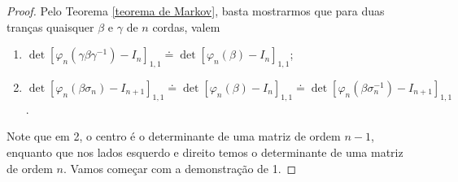 	\begin{proof}
		Pelo Teorema \ref{teorema de Markov}, basta mostrarmos que para duas tranças quaisquer 
		$\beta$ e $\gamma$ de $n$ cordas, valem
		\begin{enumerate}
			\item $\det[\varphi_n(\gamma\beta\gamma^{-1}) - I_n]_{1,1} \doteq \det[\varphi_n(\beta) - I_n]_{1,1}$;
			\item $\det[\varphi_n(\beta\sigma_n) - I_{n+1}]_{1,1}\doteq\det[\varphi_n(\beta) - I_n]_{1,1} 
			\doteq \det[\varphi_n(\beta\sigma_n^{-1}) - I_{n+1}]_{1,1}$.
		\end{enumerate}
		Note que em 2, o centro é o determinante de uma matriz de ordem $n-1$, enquanto que nos 
		lados esquerdo e direito temos o determinante de uma matriz de ordem $n$. Vamos começar 
		com a demonstração de 1.
		

\end{proof}

